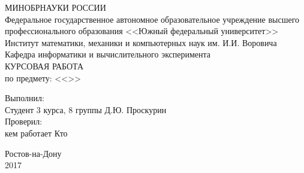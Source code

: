 \documentclass[fleqn,12pt, a4paper]{report}
\newcommand {\eps} {\varepsilon}
\begin{document}

\begin{titlepage}

\begin{center} 
\MakeUppercase{Минобрнауки России}\\
Федеральное государственное автономное образовательное учреждение
высшего профессионального образования
<<Южный федеральный университет>>\\[1 cm]

Институт математики, механики и компьютерных наук им. И.И. Воровича\\[1 cm]

Кафедра информатики и вычислительного эксперимента\\[5cm]

\Huge \MakeUppercase{Курсовая работа} \\[0.6cm]

\large по предмету: <<>>\\[7cm]

\end{center}

\begin{flushleft}
{\large 
Выполнил: \\
Студент 3 курса, 8 группы \hfill Д.Ю. Проскурин \\[1cm]

Проверил:\\
кем работает \hfill Кто}

\end{flushleft}
\vfill

\begin{center}
Ростов-на-Дону\\
2017
\end{center}
\end{titlepage}


\end{document}
